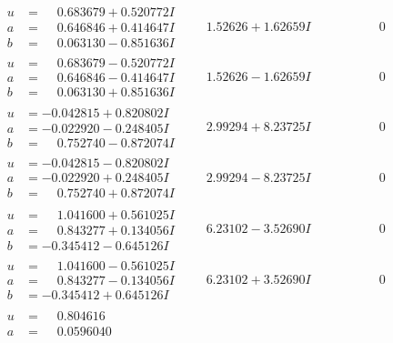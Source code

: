 \documentclass[1p]{elsarticle_modified}
\theoremstyle{definition}
\begin{document}
$$\begin{array}{c|c|c}
\begin{aligned}
u &= \phantom{-}0.683679 + 0.520772 I \\
a &= \phantom{-}0.646846 + 0.414647 I \\
b &= \phantom{-}0.063130 - 0.851636 I\end{aligned}
 & \phantom{-}1.52626 + 1.62659 I & \phantom{-0.000000 } 0 \\ \hline\begin{aligned}
u &= \phantom{-}0.683679 - 0.520772 I \\
a &= \phantom{-}0.646846 - 0.414647 I \\
b &= \phantom{-}0.063130 + 0.851636 I\end{aligned}
 & \phantom{-}1.52626 - 1.62659 I & \phantom{-0.000000 } 0 \\ \hline\begin{aligned}
u &= -0.042815 + 0.820802 I \\
a &= -0.022920 - 0.248405 I \\
b &= \phantom{-}0.752740 - 0.872074 I\end{aligned}
 & \phantom{-}2.99294 + 8.23725 I & \phantom{-0.000000 } 0 \\ \hline\begin{aligned}
u &= -0.042815 - 0.820802 I \\
a &= -0.022920 + 0.248405 I \\
b &= \phantom{-}0.752740 + 0.872074 I\end{aligned}
 & \phantom{-}2.99294 - 8.23725 I & \phantom{-0.000000 } 0 \\ \hline\begin{aligned}
u &= \phantom{-}1.041600 + 0.561025 I \\
a &= \phantom{-}0.843277 + 0.134056 I \\
b &= -0.345412 - 0.645126 I\end{aligned}
 & \phantom{-}6.23102 - 3.52690 I & \phantom{-0.000000 } 0 \\ \hline\begin{aligned}
u &= \phantom{-}1.041600 - 0.561025 I \\
a &= \phantom{-}0.843277 - 0.134056 I \\
b &= -0.345412 + 0.645126 I\end{aligned}
 & \phantom{-}6.23102 + 3.52690 I & \phantom{-0.000000 } 0 \\ \hline\begin{aligned}
u &= \phantom{-}0.804616\phantom{ +0.000000I} \\
a &= \phantom{-}0.0596040\phantom{ +0.000000I} \\

\end{aligned}
\end{array}$$
\end{document}

